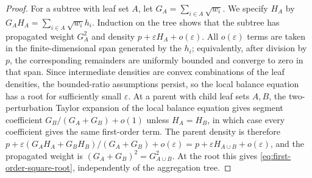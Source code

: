 \documentclass[10pt,a4paper]{amsart}
\begin{document}
\begin{proof}
For a subtree with leaf set $A$, let
$G_A=\sum_{i\in A}\sqrt{w_i}$. We specify $H_A$ by
$G_AH_A=\sum_{i\in A}\sqrt{w_i}h_i$. Induction on the tree shows that
the subtree has propagated weight $G_A^2$ and density
$p+\varepsilon H_A+o(\varepsilon)$. All $o(\varepsilon)$ terms are taken in
the finite-dimensional span generated by the $h_i$; equivalently, after
division by $p$, the corresponding remainders are uniformly bounded and
converge to zero in that span. Since intermediate densities are convex
combinations of the leaf densities, the bounded-ratio assumptions persist, so
the local balance equation has a root for sufficiently small $\varepsilon$. At
a parent with child leaf sets $A,B$, the two-perturbation Taylor expansion of
the local balance equation gives segment coefficient
$G_B/(G_A+G_B)+o(1)$ unless $H_A=H_B$, in which case every coefficient gives
the same first-order term. The parent density is therefore
$p+\varepsilon(G_AH_A+G_BH_B)/(G_A+G_B)+o(\varepsilon)
=p+\varepsilon H_{A\cup B}+o(\varepsilon)$, and the propagated weight is
$(G_A+G_B)^2=G_{A\cup B}^2$. At the root this gives
\eqref{eq:first-order-square-root}, independently of the aggregation tree.
\end{proof}
\end{document}

